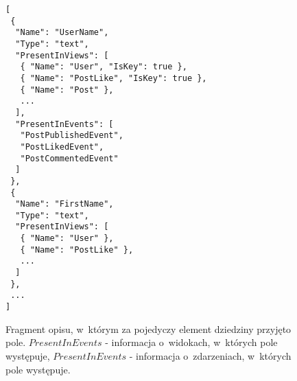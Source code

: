 \begin{figure}[!ht]
\begin{verbatim}
[
 {
  "Name": "UserName",
  "Type": "text",
  "PresentInViews": [
   { "Name": "User", "IsKey": true },
   { "Name": "PostLike", "IsKey": true },
   { "Name": "Post" },
   ...
  ],
  "PresentInEvents": [
   "PostPublishedEvent",
   "PostLikedEvent",
   "PostCommentedEvent"
  ]
 },
 {
  "Name": "FirstName",
  "Type": "text",
  "PresentInViews": [
   { "Name": "User" },
   { "Name": "PostLike" },
   ...
  ]
 },
 ...
]
\end{verbatim}
\caption{
 Fragment opisu, w~którym za pojedyczy element dziedziny przyjęto pole.
 $PresentInEvents$ - informacja o~widokach, w~których pole występuje, $PresentInEvents$ - informacja o~zdarzeniach, w~których pole występuje.
}
\label{fig:single:model_perField}
\end{figure}
